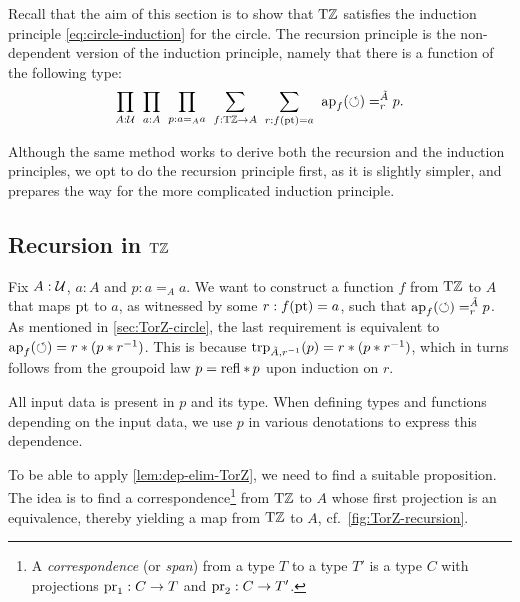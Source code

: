 \documentclass[a4paper,12pt]{amsart}
\begin{document}
Recall that the aim of this section is to show that ${\mathrm{T}\mathbb{Z}}$ satisfies the induction principle \cref{eq:circle-induction} for the circle.
The recursion principle is the non-dependent version of the induction principle,
namely that there is a function of the following type:
\begin{equation}
  \label{eq:circle-recursion}
  \thinmuskip=10mu              %
  \prod_{A: \UU}
  \prod_{a: A}
  \prod_{p: a=_A a}
  \sum_{f: \TorZ \to A}
  \sum_{r: f(\pt)= a}
  \ap{f}(\Zloop) =^{\tilde A}_r p.
\end{equation}

Although the same method works to derive both the recursion and the induction principles,
we opt to do the recursion principle first, as it is slightly simpler,
and prepares the way for the more complicated induction principle.

\subsection{Recursion in \texorpdfstring{${\mathrm{T}\mathbb{Z}}$}{TZ}}
\label{sec:TorZ-recursion}

Fix $A:\mathcal{U}$, $a:A$ and $p: a=_A a$.
We want to construct a function $f$ from ${\mathrm{T}\mathbb{Z}}$ to $A$
that maps ${\mathord{\mathrm{pt}}}$ to $a$, as witnessed by some $r : f({\mathord{\mathrm{pt}}}) = a$,
such that $\mathop{{\mathrm{ap}}_{f}}({\circlearrowleft}) =^{\tilde A}_r p$.
As mentioned in \cref{sec:TorZ-circle},
the last requirement is equivalent to $\mathop{{\mathrm{ap}}_{f}}({\circlearrowleft}) = r * (p * r^{-1})$.
This is because $\mathop{\mathrm{trp}_{\tilde A,r^{-1}}}(p) = r * (p * r^{-1})$,
which in turns follows from the groupoid law $p = \mathop{{\mathrm{refl}}_{}} *\, p$
upon induction on $r$.

All input data is present in $p$ and its type.
When defining types and functions depending on the input data,
we use $p$ in various denotations to express this dependence.

To be able to apply \cref{lem:dep-elim-TorZ}, we need to find a suitable proposition.
The idea is to find a correspondence\footnote{%
  A \emph{correspondence} (or \emph{span})
  from a type $T$ to a type $T'$ is a type $C$
  with projections $\operatorname{pr}_1 : C \to T$ and $\operatorname{pr}_2 : C \to T'$.}
from ${\mathrm{T}\mathbb{Z}}$ to $A$ whose first projection is an equivalence, thereby yielding a map from ${\mathrm{T}\mathbb{Z}}$ to $A$, cf.~\cref{fig:TorZ-recursion}.
\end{document}
